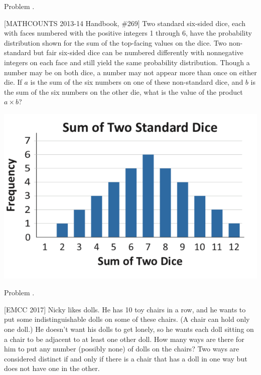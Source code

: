 \documentclass[9pt]{beamer}
\newcounter{problem}[section]
\begin{document}
\begin{frame}[t, fragile]{Problem \thesection.\theproblem}
    \begin{block}{}[MATHCOUNTS 2013-14 Handbook, \#269]
Two standard six-sided dice, each with faces numbered with the positive integers 1 through 6, have the probability distribution shown for the sum of the top-facing values on the dice. Two non-standard but fair six-sided dice can be numbered differently with nonnegative integers on each face and still yield the same probability distribution. Though a number may be on both dice, a number may not appear more than once on either die. If $a$ is the sum of the six numbers on one of these non-standard dice, and $b$ is the sum of the six numbers on the other die, what is the value of the product $a \times b$?

    \end{block}
    \begin{center}
        \includegraphics[scale=0.6]{images/hb13_169.png}
    \end{center}
    
\end{frame}

\begin{frame}[t, fragile]{Problem \thesection.\theproblem}
    \begin{block}{}[EMCC 2017]
Nicky likes dolls. He has 10 toy chairs in a row, and he wants to put some indistinguishable dolls on
some of these chairs. (A chair can hold only one doll.) He doesn’t want his dolls to get lonely, so he
wants each doll sitting on a chair to be adjacent to at least one other doll. How many ways are there
for him to put any number (possibly none) of dolls on the chairs? Two ways are considered distinct if
and only if there is a chair that has a doll in one way but does not have one in the other.


    \end{block}
\end{frame}
\end{document}
